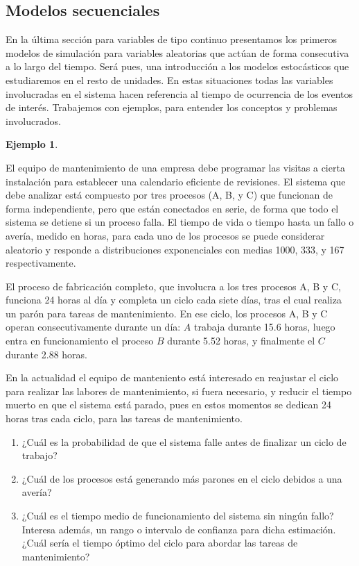 \documentclass[
]{book}
\providecommand{\tightlist}{%
  \setlength{\itemsep}{0pt}\setlength{\parskip}{0pt}}
\theoremstyle{definition}
\theoremstyle{definition}
\newtheorem{example}{Ejemplo}[chapter]
\theoremstyle{definition}
\theoremstyle{definition}
\theoremstyle{remark}
\begin{document}
\hypertarget{modelos-secuenciales}{%
\subsection{Modelos secuenciales}\label{modelos-secuenciales}}

En la última sección para variables de tipo continuo presentamos los primeros modelos de simulación para variables aleatorias que actúan de forma consecutiva a lo largo del tiempo. Será pues, una introducción a los modelos estocásticos que estudiaremos en el resto de unidades. En estas situaciones todas las variables involucradas en el sistema hacen referencia al tiempo de ocurrencia de los eventos de interés. Trabajemos con ejemplos, para entender los conceptos y problemas involucrados.

\begin{example}
\protect\hypertarget{exm:secuencia1}{}\label{exm:secuencia1}

El equipo de mantenimiento de una empresa debe programar las visitas a cierta instalación para establecer una calendario eficiente de revisiones. El sistema que debe analizar está compuesto por tres procesos (A, B, y C) que funcionan de forma independiente, pero que están conectados en serie, de forma que todo el sistema se detiene si un proceso falla. El tiempo de vida o tiempo hasta un fallo o avería, medido en horas, para cada uno de los procesos se puede considerar aleatorio y responde a distribuciones exponenciales con medias 1000, 333, y 167 respectivamente.

El proceso de fabricación completo, que involucra a los tres procesos A, B y C, funciona 24 horas al día y completa un ciclo cada siete días, tras el cual realiza un parón para tareas de mantenimiento. En ese ciclo, los procesos A, B y C operan consecutivamente durante un día: \(A\) trabaja durante 15.6 horas, luego entra en funcionamiento el proceso \(B\) durante 5.52 horas, y finalmente el \(C\) durante 2.88 horas.

En la actualidad el equipo de manteniento está interesado en reajustar el ciclo para realizar las labores de mantenimiento, si fuera necesario, y reducir el tiempo muerto en que el sistema está parado, pues en estos momentos se dedican 24 horas tras cada ciclo, para las tareas de mantenimiento.

\begin{enumerate}
\def\labelenumi{\arabic{enumi}.}
\tightlist
\item
  ¿Cuál es la probabilidad de que el sistema falle antes de finalizar un ciclo de trabajo?
\item
  ¿Cuál de los procesos está generando más parones en el ciclo debidos a una avería?
\item
  ¿Cuál es el tiempo medio de funcionamiento del sistema sin ningún fallo? Interesa además, un rango o intervalo de confianza para dicha estimación. ¿Cuál sería el tiempo óptimo del ciclo para abordar las tareas de mantenimiento?
\end{enumerate}

\end{example}
\end{document}
